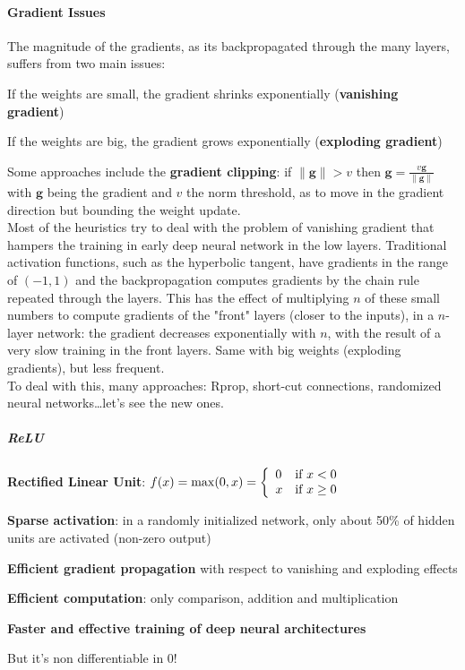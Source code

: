\documentclass[10pt]{report}
\begin{document}
\paragraph{Gradient Issues} The magnitude of the gradients, as its backpropagated through the many layers, suffers from two main issues:
\begin{list}{}{}
	\item If the weights are small, the gradient shrinks exponentially (\textbf{vanishing gradient})
	\item If the weights are big, the gradient grows exponentially (\textbf{exploding gradient})
\end{list}
Some approaches include the \textbf{gradient clipping}: if $\|\mathbf{g}\|> v$ then $\mathbf{g} = \frac{v\mathbf{g}}{\|\mathbf{g}\|}$ with $\mathbf{g}$ being the gradient and $v$ the norm threshold, as to move in the gradient direction but bounding the weight update.\\
Most of the heuristics try to deal with the problem of vanishing gradient that hampers the training in early deep neural network in the low layers. Traditional activation functions, such as the hyperbolic tangent, have gradients in the range of $(-1,1)$ and the backpropagation computes gradients by the chain rule repeated through the layers. This has the effect of multiplying $n$ of these small numbers to compute gradients of the "front" layers (closer to the inputs), in a $n$-layer network: the gradient decreases exponentially with $n$, with the result of a very slow training in the front layers. Same with big weights (exploding gradients), but less frequent.\\
To deal with this, many approaches: Rprop, short-cut connections, randomized neural networks\ldots let's see the new ones.
\subparagraph{ReLU} \textbf{Rectified Linear Unit}: $f(x) = \max(0,x) = \left\{\begin{array}{l l}
0&\text{if }x< 0\\
x&\text{if }x\geq 0\\
\end{array}\right.$
\begin{list}{}{}
	\item \textbf{Sparse activation}: in a randomly initialized network, only about 50\% of hidden units are activated (non-zero output)
	\item \textbf{Efficient gradient propagation} with respect to vanishing and exploding effects
	\item \textbf{Efficient computation}: only comparison, addition and multiplication
	\item \textbf{Faster and effective training of deep neural architectures}
	\item But it's non differentiable in 0!
\end{list}
\end{document}
